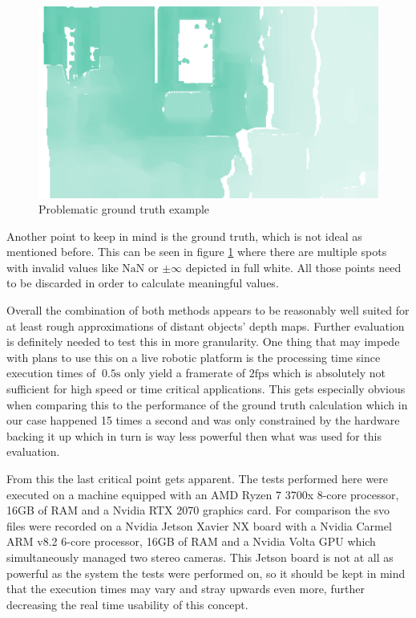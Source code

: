 \begin{figure}[ht!]
    \begin{center}
        \includegraphics*[scale=.22, pagebox=artbox]{resources/example_depth.png}
        \caption{Problematic ground truth example} \label{example_depth}
    \end{center}
\end{figure}

Another point to keep in mind is the ground truth, which is not ideal as mentioned before. This can be seen in figure \ref*{example_depth} where there are multiple spots with invalid values like $\mathrm{NaN}$ or $\pm\infty$ depicted in full white. All those points need to be discarded in order to calculate meaningful values.

Overall the combination of both methods appears to be reasonably well suited for at least rough approximations of distant objects' depth maps. Further evaluation is definitely needed to test this in more granularity. One thing that may impede with plans to use this on a live robotic platform is the processing time since execution times of $~0.5\mathrm{s}$ only yield a framerate of $2\mathrm{fps}$ which is absolutely not sufficient for high speed or time critical applications. This gets especially obvious when comparing this to the performance of the ground truth calculation which in our case happened 15 times a second and was only constrained by the hardware backing it up which in turn is way less powerful then what was used for this evaluation.

From this the last critical point gets apparent. The tests performed here were executed on a machine equipped with an AMD Ryzen 7 3700x 8-core processor, 16GB of RAM and a Nvidia RTX 2070 graphics card. For comparison the svo files were recorded on a Nvidia Jetson Xavier NX board with a Nvidia Carmel ARM v8.2 6-core processor, 16GB of RAM and a Nvidia Volta GPU which simultaneously managed two stereo cameras. This Jetson board is not at all as powerful as the system the tests were performed on, so it should be kept in mind that the execution times may vary and stray upwards even more, further decreasing the real time usability of this concept.
